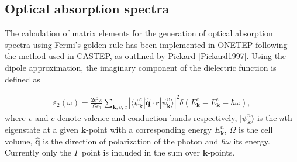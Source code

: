 \documentclass[letterpaper,10pt,english]{sphinxmanual}
\begin{document}
\subsection{Optical absorption spectra}
\label{\detokenize{conduction:optical-absorption-spectra}}
The calculation of matrix elements for the generation of optical
absorption spectra using Fermi’s golden rule has been implemented in
ONETEP following the method used in CASTEP, as outlined by
Pickard {[}Pickard1997{]}. Using the dipole approximation, the
imaginary component of the dielectric function is defined as

\label{\detokenize{conduction:equation-imag-diel}}\begin{equation}\label{equation:conduction:imag_diel}
\begin{split}\varepsilon_2\left(\omega\right)=\frac{2e^2\pi}{\Omega\epsilon_0}\sum_{\mathbf{k},v,c}\left|\langle\psi_{\mathbf{k}}^{c}|\mathbf{\hat{q}}\cdot\mathbf{r}|\psi_{\mathbf{k}}^{v}\rangle\right|^2\delta\left(E_{\mathbf{k}}^{c}-E_{\mathbf{k}}^{v}-\hbar\omega\right) ,\end{split}
\end{equation}
where \(v\) and \(c\) denote valence and conduction bands
respectively, \(|\psi_{\mathbf{k}}^{n}\rangle\) is the \(n\)th
eigenstate at a given \(\mathbf{k}\)-point with a corresponding
energy \(E_{\mathbf{k}}^n\), \(\Omega\) is the cell volume,
\(\mathbf{\hat{q}}\) is the direction of polarization of the photon
and \(\hbar\omega\) its energy. Currently only the \(\Gamma\)
point is included in the sum over \(\mathbf{k}\)-points.
\end{document}
